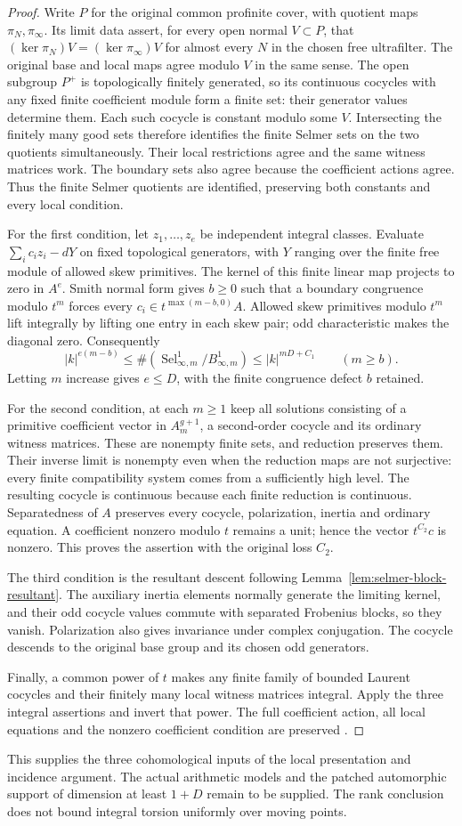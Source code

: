\begin{proof}
Write $P$ for the original common profinite cover, with quotient maps
$\pi_N,\pi_\infty$. Its limit data assert, for every open normal
$V\subset P$, that
$(\ker\pi_N)V=(\ker\pi_\infty)V$ for almost every $N$ in the
chosen free ultrafilter. The original base and local maps agree modulo
$V$ in the same sense. The open subgroup $P^+$ is topologically
finitely generated, so its continuous cocycles with any fixed finite
coefficient module form a finite set: their generator values determine
them. Each such cocycle is constant modulo some $V$. Intersecting the
finitely many good sets therefore identifies the finite Selmer sets on
the two quotients simultaneously. Their local restrictions agree and
the same witness matrices work. The boundary sets also agree because
the coefficient actions agree. Thus the finite Selmer quotients are
identified, preserving both constants and every local condition.

For the first condition, let $z_1,\ldots,z_e$ be independent integral
classes. Evaluate $\sum_i c_i z_i-dY$ on fixed topological generators,
with $Y$ ranging over the finite free module of allowed skew primitives.
The kernel of this finite linear map projects to zero in $A^e$.
Smith normal form gives $b\geq0$ such that a boundary congruence
modulo $t^m$ forces every $c_i\in t^{\max(m-b,0)}A$.
Allowed skew primitives modulo $t^m$ lift integrally by lifting one
entry in each skew pair; odd characteristic makes the diagonal zero.
Consequently
\[
 |k|^{e(m-b)}\leq
 \#(\operatorname{Sel}^1_{\infty,m}/B^1_{\infty,m})
 \leq |k|^{mD+C_1}\qquad(m\geq b).
\]
Letting $m$ increase gives $e\leq D$, with the finite congruence
defect $b$ retained.

For the second condition, at each $m\geq1$ keep all solutions
consisting of a primitive coefficient vector in $A_m^{g+1}$,
a second-order cocycle and its ordinary witness matrices. These are
nonempty finite sets, and reduction preserves them. Their inverse
limit is nonempty even when the reduction maps are not surjective:
every finite compatibility system comes from a sufficiently high
level. The resulting cocycle is continuous because each finite
reduction is continuous. Separatedness of $A$ preserves every
cocycle, polarization, inertia and ordinary equation. A coefficient
nonzero modulo $t$ remains a unit; hence the vector $t^{C_2}c$ is
nonzero. This proves the assertion with the original loss $C_2$.

The third condition is the resultant descent following
Lemma~\ref{lem:selmer-block-resultant}. The auxiliary inertia elements
normally generate the limiting kernel, and their odd cocycle values
commute with separated Frobenius blocks, so they vanish. Polarization
also gives invariance under complex conjugation. The cocycle descends
to the original base group and its chosen odd generators.

Finally, a common power of $t$ makes any finite family of bounded
Laurent cocycles and their finitely many local witness matrices
integral. Apply the three integral assertions and invert that power.
The full coefficient action, all local equations and the nonzero
coefficient condition are preserved \cite{alpo-selmer-limit-comparison}.
\end{proof}

This supplies the three cohomological inputs of the local presentation
and incidence argument. The actual arithmetic models and the patched
automorphic support of dimension at least $1+D$ remain to be supplied.
The rank conclusion does not bound integral torsion uniformly over
moving points.
